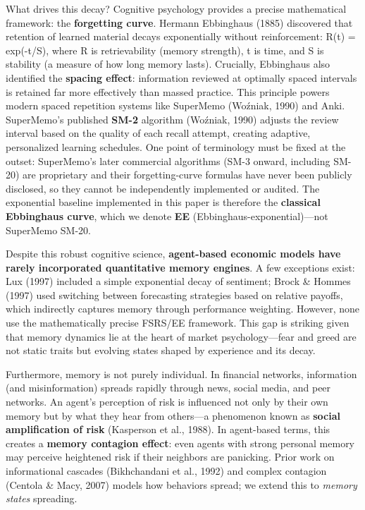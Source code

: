 \documentclass[11pt]{article}
\begin{document}
What drives this decay? Cognitive psychology provides a precise mathematical framework: the \textbf{forgetting curve}. Hermann Ebbinghaus (1885) discovered that retention of learned material decays exponentially without reinforcement: R(t) = exp(-t/S), where R is retrievability (memory strength), t is time, and S is stability (a measure of how long memory lasts). Crucially, Ebbinghaus also identified the \textbf{spacing effect}: information reviewed at optimally spaced intervals is retained far more effectively than massed practice. This principle powers modern spaced repetition systems like SuperMemo (Woźniak, 1990) and Anki. SuperMemo's published \textbf{SM-2} algorithm (Woźniak, 1990) adjusts the review interval based on the quality of each recall attempt, creating adaptive, personalized learning schedules. One point of terminology must be fixed at the outset: SuperMemo's later commercial algorithms (SM-3 onward, including SM-20) are proprietary and their forgetting-curve formulas have never been publicly disclosed, so they cannot be independently implemented or audited. The exponential baseline implemented in this paper is therefore the \textbf{classical Ebbinghaus curve}, which we denote \textbf{EE} (Ebbinghaus-exponential)---not SuperMemo SM-20.

Despite this robust cognitive science, \textbf{agent-based economic models have rarely incorporated quantitative memory engines}. A few exceptions exist: Lux (1997) included a simple exponential decay of sentiment; Brock \& Hommes (1997) used switching between forecasting strategies based on relative payoffs, which indirectly captures memory through performance weighting. However, none use the mathematically precise FSRS/EE framework. This gap is striking given that memory dynamics lie at the heart of market psychology---fear and greed are not static traits but evolving states shaped by experience and its decay.

Furthermore, memory is not purely individual. In financial networks, information (and misinformation) spreads rapidly through news, social media, and peer networks. An agent's perception of risk is influenced not only by their own memory but by what they hear from others---a phenomenon known as \textbf{social amplification of risk} (Kasperson et al., 1988). In agent-based terms, this creates a \textbf{memory contagion effect}: even agents with strong personal memory may perceive heightened risk if their neighbors are panicking. Prior work on informational cascades (Bikhchandani et al., 1992) and complex contagion (Centola \& Macy, 2007) models how behaviors spread; we extend this to \textit{memory states} spreading.
\end{document}
